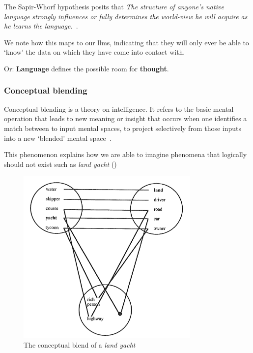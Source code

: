 The Sapir-Whorf hypothesis posits that  \textit{The structure of anyone’s native
    language strongly influences or fully determines the world-view he will acquire
    as he learns the language.}~\cite[128]{sapirWhorf}.

We note how this maps to our \acrshort{llms}, indicating that they will only ever
be able to `know' the data on which they have come into contact with.

Or: \textbf{Language} defines the possible room for \textbf{thought}.


\subsubsection{Conceptual blending}

Conceptual blending is a theory on intelligence. It refers to the basic mental
operation that leads to new meaning or insight that occurs when one identifies
a match between to input mental spaces, to project selectively from those inputs
into a new `blended' mental space~\cite[57-58]{conceptBlending}.

This phenomenon explains how we are able to imagine phenomena that logically
should not exist such as \textit{land yacht} ()

\begin{figure}[h]
    \centering
    \includegraphics[width=0.8\textwidth]{figures/landYacht.png}
    \caption[Land yacht conceptual blend]{The conceptual blend of a \textit{land
            yacht}\footnotemark}\label{fig:landYacht}
\end{figure}

